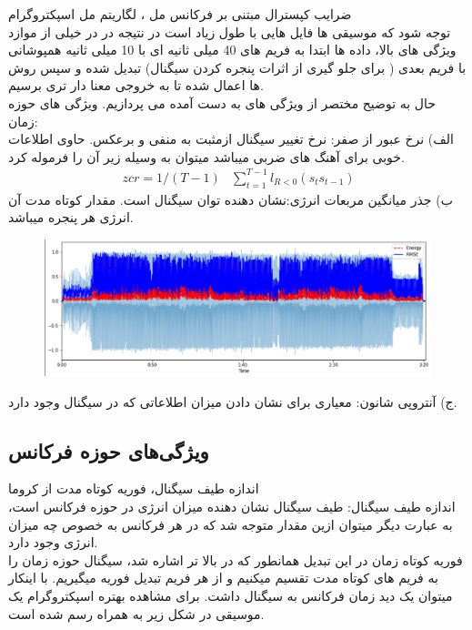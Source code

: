 \documentclass[10pt,onecolumn,a4paper]{article}
\begin{document}
 ضرایب کپسترال مبتنی بر فرکانس مل
، لگاریتم مل اسپکتروگرام
\\
توجه شود که موسیقی ها فایل هایی با طول زیاد است در نتیجه در در خیلی از موازد ویژگی های بالا، داده ها ابتدا به فریم های 40 میلی ثانیه ای  با 10 میلی ثانیه همپوشانی با فریم بعدی ( برای جلو گیری از اثرات پنجره کردن سیگنال) تبدیل شده و سپس روش ها اعمال شده تا به خروجی معنا دار تری برسیم.\\
حال به توضیح مختصر از ویژگی های به دست آمده می پردازیم.
ویژگی های حوزه زمان:\\
الف) نرخ عبور از صفر: نرخ تغییر سیگنال ازمثبت به منفی و برعکس. حاوی اطلاعات خوبی برای آهنگ های ضربی میباشد میتوان به وسیله زیر آن را فرموله کرد.\\
\begin{align*}
\ zcr = 1/(T-1)&\sum_{t=1}^{T-1}l_{R<0}(s_{t}s_{t-1})
\end{align*}
ب) جذر میانگین مربعات انرژی:نشان دهنده توان سیگنال است. مقدار کوتاه مدت آن انرژی هر پنجره میباشد.\\
\begin{figure}[h!]
        \centering
        \includegraphics[scale=0.5]{2.png}
        \caption{  }  
    \end{figure}

ج)  آنتروپی شانون:  معیاری برای نشان دادن میزان اطلاعاتی که در سیگنال وجود دارد.\\

\subsection{ویژگی‌های حوزه فرکانس}

اندازه طیف سیگنال، فوریه کوتاه مدت از کروما \\

 اندازه طیف سیگنال: طیف سیگنال نشان دهنده میزان انرژی در حوزه فرکانس است، به عبارت دیگر میتوان ازین مقدار متوجه شد که در هر فرکانس به خصوص چه میزان انرژی وجود دارد.\\
 فوریه کوتاه زمان  در این تبدیل همانطور که در بالا تر اشاره شد، سیگنال حوزه زمان را به فریم های کوتاه مدت تقسیم میکنیم و از هر فریم تبدیل فوریه میگیریم. با اینکار میتوان یک دید زمان فرکانس به سیگنال داشت. برای مشاهده بهتره اسپکتروگرام یک موسیقی در شکل زیر به همراه  رسم شده است.\\
 
\end{document}

